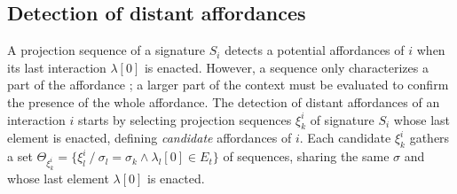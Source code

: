 \documentclass[conference]{IEEEtran}
\begin{document}





\subsection{Detection of distant affordances}\label{detection}



A projection sequence of a signature $S_i$ detects a potential affordances of $i$ when its last interaction $\lambda[0]$ is enacted. %
However, a sequence only characterizes a part of the affordance ; a larger part of the context must be evaluated to confirm the presence of the whole affordance.
The detection of distant affordances of an interaction $i$ starts by selecting projection sequences $\xi_k^i$ of signature $S_i$ whose last element is enacted, defining \textit{candidate} affordances of $i$. Each candidate $\xi_k^i$ gathers a set $\Theta_{\xi_k^i} = \{\xi_l^i ~/~ \sigma_l = \sigma_k \wedge \lambda_l[0] \in E_t\}$ of sequences, sharing the same $\sigma$ and whose last element $\lambda[0]$ is enacted. %
\end{document}
